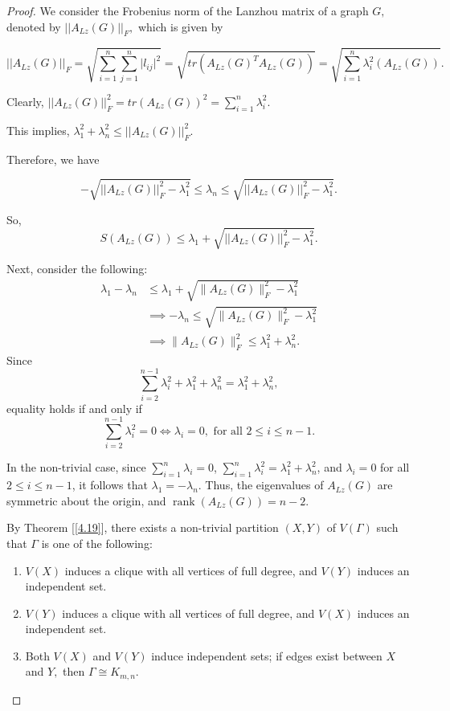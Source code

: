 \documentclass[10pt,a4paper,oneside]{article}
\begin{document}
\begin{proof}
We consider the Frobenius norm of the Lanzhou matrix of a graph $G,$ denoted by $\vert\vert A_{Lz}(G)\vert \vert_F,$ which is given by 
	
$$\vert\vert A_{Lz}(G)\vert \vert_F=\sqrt{\sum\limits_{i=1}^{n}\sum\limits_{j=1}^{n}\vert l_{ij}\vert^2}=\sqrt{tr(A_{Lz}(G)^TA_{Lz}(G))}=\sqrt{\sum\limits_{i=1}^{n}\lambda_i^2(A_{Lz}(G))}.$$
	
Clearly, $\vert\vert A_{Lz}(G)\vert \vert_F^2=tr(A_{Lz}(G))^2=\sum\limits_{i=1}^{n}\lambda_i^2.$
	
This implies, $\lambda_1^2+\lambda_n^2\leq \vert\vert A_{Lz}(G)\vert \vert_F^2.$
	
Therefore, we have

$$-\sqrt{\vert\vert A_{Lz}(G)\vert \vert_F^2-\lambda_1^2}\leq \lambda_n \leq \sqrt{\vert\vert A_{Lz}(G)\vert \vert_F^2-\lambda_1^2}.$$
	
So, $$S(A_{Lz}(G))\leq \lambda_1+\sqrt{\vert\vert A_{Lz}(G)\vert \vert_F^2-\lambda_1^2}.$$
	



Next, consider the following:
\begin{align*}
\lambda_1 - \lambda_n &\leq \lambda_1 + \sqrt{\|A_{Lz}(G)\|_F^2 - \lambda_1^2} \\
&\implies -\lambda_n \leq \sqrt{\|A_{Lz}(G)\|_F^2 - \lambda_1^2} \\
&\implies \|A_{Lz}(G)\|_F^2 \leq \lambda_1^2 + \lambda_n^2.
\end{align*}
Since
\[
\sum_{i=2}^{n-1} \lambda_i^2 + \lambda_1^2 + \lambda_n^2 = \lambda_1^2 + \lambda_n^2,
\]
equality holds if and only if
\[
\sum_{i=2}^{n-1} \lambda_i^2 = 0 \iff \lambda_i = 0, \text{\ for all\ } 2 \leq i \leq n-1.
\]

In the non-trivial case, since $\sum_{i=1}^n \lambda_i = 0$, $\sum_{i=1}^n \lambda_i^2 = \lambda_1^2 + \lambda_n^2$, and $\lambda_i = 0$ for all $2 \leq i \leq n-1$, it follows that $\lambda_1 = -\lambda_n$. Thus, the eigenvalues of $A_{Lz}(G)$ are symmetric about the origin, and $\operatorname{rank}(A_{Lz}(G)) = n-2$.

By Theorem [\ref{4.19}], there exists a non-trivial partition $(X,Y)$ of $V(\Gamma)$ such that $\Gamma$ is one of the following:
\begin{enumerate}
\item $V(X)$ induces a clique with all vertices of full degree, and $V(Y)$ induces an independent set.
\item $V(Y)$ induces a clique with all vertices of full degree, and $V(X)$ induces an independent set.
\item Both $V(X)$ and $V(Y)$ induce independent sets; if edges exist between $X$ and $Y,$ then $\Gamma \cong K_{m,n}.$
\end{enumerate}
\end{proof}
\end{document}

